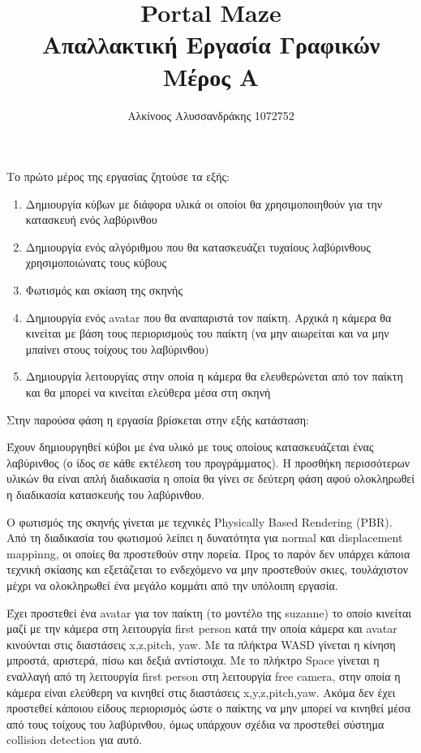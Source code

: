 \documentclass{article}
\title{
	Portal Maze\\
	\large Απαλλακτική Εργασία Γραφικών\\
	Μέρος Α
}
\author{Αλκίνοος Αλυσσανδράκης 1072752}
\date{}
\begin{document}
\maketitle

Το πρώτο μέρος της εργασίας ζητούσε τα εξής:

\begin{enumerate}
	\item Δημιουργία κύβων με διάφορα υλικά οι οποίοι θα χρησιμοποιηθούν για την κατασκευή
		ενός λαβύρινθου
	\item Δημιουργία ενός αλγόριθμου που θα κατασκευάζει τυχαίους λαβύρινθους χρησιμοποιώνατς
		τους κύβους
	\item Φωτισμός και σκίαση της σκηνής
	\item Δημιουργία ενός avatar που θα αναπαριστά τον παίκτη. Αρχικά η κάμερα θα κινείται
		με βάση τους περιορισμούς του παίκτη (να μην αιωρείται και να μην μπαίνει στους
		τοίχους του λαβύρινθου)
	\item Δημιουργία λειτουργίας στην οποία η κάμερα θα ελευθερώνεται από τον παίκτη και
		θα μπορεί να κινείται ελεύθερα μέσα στη σκηνή
\end{enumerate}

\noindent
Στην παρούσα φάση η εργασία βρίσκεται στην εξής κατάσταση:

Έχουν δημιουργηθεί κύβοι με ένα υλικό με τους οποίους κατασκευάζεται ένας λαβύρινθος (ο ίδος
σε κάθε εκτέλεση του προγράμματος). Η προσθήκη περισσότερων υλικών θα είναι απλή
διαδικασία η οποία θα γίνει σε δεύτερη φάση αφού ολοκληρωθεί η διαδικασία κατασκευής του
λαβύρινθου.

Ο φωτισμός της σκηνής γίνεται με τεχνικές Physically Based Rendering (PBR).
Από τη διαδικασία του φωτισμού λείπει η δυνατότητα για normal και displacement mappinng,
οι οποίες θα προστεθούν στην πορεία. Προς το παρόν δεν υπάρχει κάποια τεχνική σκίασης και
εξετάζεται το ενδεχόμενο να μην προστεθούν σκιες, τουλάχιστον μέχρι να ολοκληρωθεί ένα
μεγάλο κομμάτι από την υπόλοιπη εργασία.

Έχει προστεθεί ένα avatar για τον παίκτη (το μοντέλο της suzanne) το οποίο κινείται μαζί
με την κάμερα στη λειτουργία first person κατά την οποία κάμερα και avatar κινούνται στις
διαστάσεις x,z,pitch, yaw. Με τα πλήκτρα WASD γίνεται η κίνηση μπροστά, αριστερά,
πίσω και δεξιά αντίστοιχα. Με το πλήκτρο Space γίνεται η εναλλαγή από τη λειτουργία
first person στη λειτουργία free camera, στην οποία η κάμερα είναι ελεύθερη να κινηθεί
στις διαστάσεις x,y,z,pitch,yaw. Ακόμα δεν έχει προστεθεί κάποιου είδους περιορισμός ώστε
ο παίκτης να μην μπορεί να κινηθεί μέσα από τους τοίχους του λαβύρινθου, όμως υπάρχουν
σχέδια να προστεθεί σύστημα collision detection για αυτό.
\end{document}
